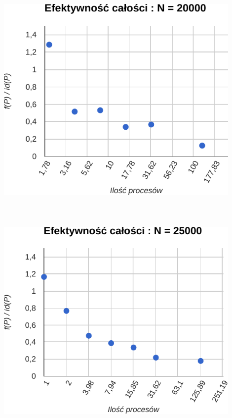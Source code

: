 \documentclass[paper=a4, fontsize=11pt]{scrartcl}	%
\numberwithin{equation}{section}		%
\numberwithin{figure}{section}			%
\numberwithin{table}{section}				%
\begin{document}
\includegraphics[width=120mm]{report/eff-20000.pdf} \\ \ \\ \ \\ \ \\

\includegraphics[width=120mm]{report/eff-25000.pdf} \\ \ \\ \ \\ \ \\
\end{document}
